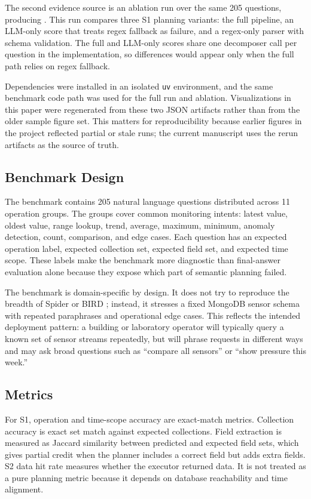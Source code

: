 \documentclass[11pt]{article}
\begin{document}
The second evidence source is an ablation run over the same 205 questions, producing . This run compares three S1 planning variants: the full pipeline, an LLM-only score that treats regex fallback as failure, and a regex-only parser with schema validation. The full and LLM-only scores share one decomposer call per question in the implementation, so differences would appear only when the full path relies on regex fallback.

Dependencies were installed in an isolated \texttt{uv} environment, and the same benchmark code path was used for the full run and ablation. Visualizations in this paper were regenerated from these two JSON artifacts rather than from the older sample figure set. This matters for reproducibility because earlier figures in the project reflected partial or stale runs; the current manuscript uses the rerun artifacts as the source of truth.

\subsection{Benchmark Design}

The benchmark contains 205 natural language questions distributed across 11 operation groups. The groups cover common monitoring intents: latest value, oldest value, range lookup, trend, average, maximum, minimum, anomaly detection, count, comparison, and edge cases. Each question has an expected operation label, expected collection set, expected field set, and expected time scope. These labels make the benchmark more diagnostic than final-answer evaluation alone because they expose which part of semantic planning failed.

The benchmark is domain-specific by design. It does not try to reproduce the breadth of Spider or BIRD \cite{yu2018spider,li2023bird}; instead, it stresses a fixed MongoDB sensor schema with repeated paraphrases and operational edge cases. This reflects the intended deployment pattern: a building or laboratory operator will typically query a known set of sensor streams repeatedly, but will phrase requests in different ways and may ask broad questions such as ``compare all sensors'' or ``show pressure this week.''

\subsection{Metrics}

For S1, operation and time-scope accuracy are exact-match metrics. Collection accuracy is exact set match against expected collections. Field extraction is measured as Jaccard similarity between predicted and expected field sets, which gives partial credit when the planner includes a correct field but adds extra fields. S2 data hit rate measures whether the executor returned data. It is not treated as a pure planning metric because it depends on database reachability and time alignment.
\end{document}
